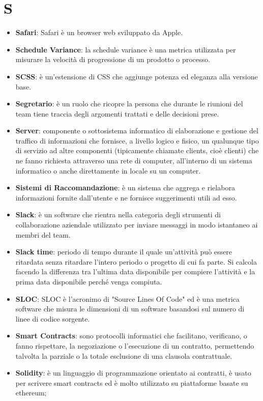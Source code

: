 \documentclass[a4paper, oneside, openany, dvipsnames, table]{article}
\begin{document}
\section{S}
\begin{itemize}
\item \textbf{Safari}: Safari è un browser web sviluppato da Apple.
\item \textbf{Schedule Variance}: la schedule variance è una metrica utilizzata per misurare la velocità di progressione di un prodotto o processo.
\item \textbf{SCSS}: è un'estensione di CSS che aggiunge potenza ed eleganza alla versione base.
\item \textbf{Segretario}: è un ruolo che ricopre la persona che durante le riunioni del team tiene traccia degli argomenti trattati e delle decisioni prese.
\item \textbf{Server}: componente o sottosistema informatico di elaborazione e gestione del traffico di informazioni che fornisce, a livello logico e fisico, un qualunque tipo di servizio ad altre componenti (tipicamente chiamate clients, cioè clienti) che ne fanno richiesta attraverso una rete di computer, all’interno di un sistema informatico o anche direttamente in locale su un computer.
\item \textbf{Sistemi di Raccomandazione}: è un sistema che aggrega e rielabora informazioni fornite dall'utente e ne fornisce suggerimenti utili ad esso.
\item \textbf{Slack}: è un software che rientra nella categoria degli strumenti di collaborazione aziendale utilizzato per inviare messaggi in modo istantaneo ai membri del team.
\item \textbf{Slack time}: periodo di tempo durante il quale un'attività può essere ritardata senza ritardare l'intero periodo o progetto di cui fa parte. Si calcola facendo la differenza tra l'ultima data disponibile per compiere l'attività e la prima data disponibile perché venga compiuta.
\item \textbf{SLOC}: SLOC è l'acronimo di "Source Lines Of Code"  ed è una metrica software che misura le dimensioni di un software basandosi sul numero di linee di codice sorgente.
\item \textbf{Smart Contracts}: sono protocolli informatici che facilitano, verificano, o fanno rispettare, la negoziazione o l'esecuzione di un contratto, permettendo talvolta la parziale o la totale esclusione di una clausola contrattuale.
\item \textbf{Solidity}: è un linguaggio di programmazione orientato ai contratti, è usato per scrivere smart contracts ed è molto utilizzato su piattaforme basate su ethereum;

\end{itemize}
\end{document}
